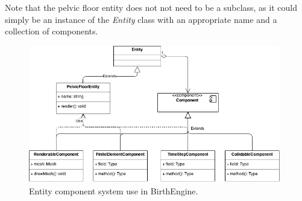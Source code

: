 Note that the pelvic floor entity does not not need to be a subclass, as it could simply be an instance of the \textit{Entity} class with an appropriate name and a collection of components.

\begin{figure}
\begin{center}
\includegraphics[width=110mm]{sections/methodology/images/software/software-ecs.png}
\caption[Entity component system use in BirthEngine.]{\label{software-ecs} Entity component system use in BirthEngine.}
\end{center}
\end{figure}
